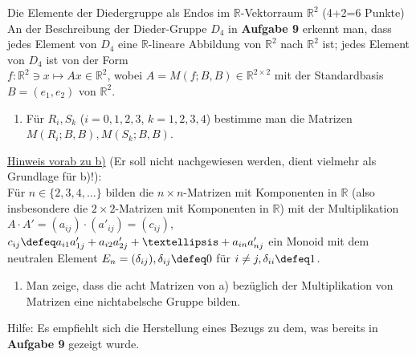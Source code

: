 \documentclass{uebblatt}
\begin{document}
\begin{aufgabe}{Die Elemente der Diedergruppe als Endos im $\mathbb{R}$-Vektorraum $\mathbb{R}^2$ (4+2=6 Punkte)}
An der Beschreibung der Dieder-Gruppe $D_4$ in \textbf{Aufgabe 9} erkennt man, dass jedes Element von $D_4$ eine $\mathbb{R}$-lineare Abbildung von $\mathbb{R}^2$ nach $\mathbb{R}^2$ ist; jedes Element von $D_4$ ist von der Form\\
$f : \mathbb{R}^2 \ni x \mapsto Ax \in \mathbb{R}^2$, wobei $A = M(f; B, B) \in \mathbb{R}^{2 \times 2}$ mit der Standardbasis $B = (e_1, e_2)$ von $\mathbb{R}^2$.
\begin{enumerate}
\item Für $R_i, S_k$ ($i = 0, 1, 2, 3$, $k = 1, 2, 3, 4$) bestimme man die Matrizen $M(R_i; B, B), M(S_k; B, B)$.
\end{enumerate}
\underline{Hinweis vorab zu b)} (Er soll nicht nachgewiesen werden, dient vielmehr als Grundlage für b)!): \\
Für $n \in \{2, 3, 4, …\}$ bilden die $n \! \times \! n$-Matrizen mit Komponenten in $\mathbb{R}$ (also insbesondere die $2 \! \times \! 2$-Matrizen mit Komponenten in $\mathbb{R}$) mit der Multiplikation $A \cdot A' = (a_{ij}) \cdot (a'_{ij}) = (c_{ij})$, $c_{ij} \defeq a_{i1} a'_{1j} + a_{i2} a'_{2j} + … + a_{in} a'_{nj}$ ein Monoid mit dem neutralen Element $E_n = (\delta_{ij}), \delta_{ij} \defeq 0$ für $i \neq j, \delta_{ii} \defeq 1$. 
\begin{enumerate}[resume]
\item Man zeige, dass die acht Matrizen von a) bezüglich der Multiplikation von Matrizen eine nichtabelsche Gruppe bilden.
\end{enumerate}
Hilfe: Es empfiehlt sich die Herstellung eines Bezugs zu dem, was bereits in \textbf{Aufgabe 9} gezeigt wurde.
\end{aufgabe}

\newpage
\end{document}
